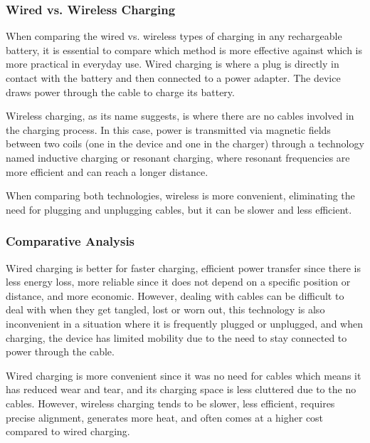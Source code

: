 \subsubsection{Wired vs. Wireless Charging}
When comparing the wired vs. wireless types of charging in any rechargeable battery, it is essential to compare which method is more effective against which is more practical in everyday use. Wired charging is where a plug is directly in contact with the battery and then connected to a power adapter. The device draws power through the cable to charge its battery. 

Wireless charging, as its name suggests, is where there are no cables involved in the charging process. In this case, power is transmitted via magnetic fields between two coils (one in the device and one in the charger) through a technology named inductive charging or resonant charging, where resonant frequencies are more efficient and can reach a longer distance. 

When comparing both technologies, wireless is more convenient, eliminating the need for plugging and unplugging cables, but it can be slower and less efficient.
\cite{wiredvwirelessMohammed}

\subsubsection{Comparative Analysis}
Wired charging is better for faster charging, efficient power transfer since there is less energy loss, more reliable since it does not depend on a specific position or distance, and more economic. However, dealing with cables can be difficult to deal with when they get tangled, lost or worn out, this technology is also inconvenient in a situation where it is frequently plugged or unplugged, and when charging, the device has limited mobility due to the need to stay connected to power through the cable. 

Wired charging is more convenient since it was no need for cables which means it has reduced wear and tear, and its charging space is less cluttered due to the no cables. However, wireless charging tends to be slower, less efficient, requires precise alignment, generates more heat, and often comes at a higher cost compared to wired charging.
\cite{wirelessLu}

